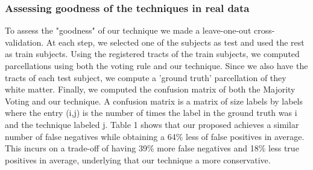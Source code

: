 
\subsubsection{Assessing goodness of the techniques in real data}
To assess the "goodness" of our technique we made a leave-one-out
cross-validation. At each step, we selected one of the subjects as test and 
used the rest as train subjects. Using the registered tracts of the train
subjects, we computed parcellations using both the voting rule and our technique.
Since we also have the tracts of each test subject, we compute a 'ground truth'
parcellation of they white matter. Finally, we computed the confusion matrix of
both the Majority Voting and our technique. A confusion matrix is a matrix of 
size labels by labels where the entry (i,j) is the number of times the label in
the ground truth was i and the technique labeled j. Table 1 shows that our
proposed achieves a similar number of false negatives while obtaining a 64\%
less of false positives in average. This incurs on a trade-off of having 39\%
more false negatives and 18\% less true positives in average, underlying that
our technique a more conservative.\\

